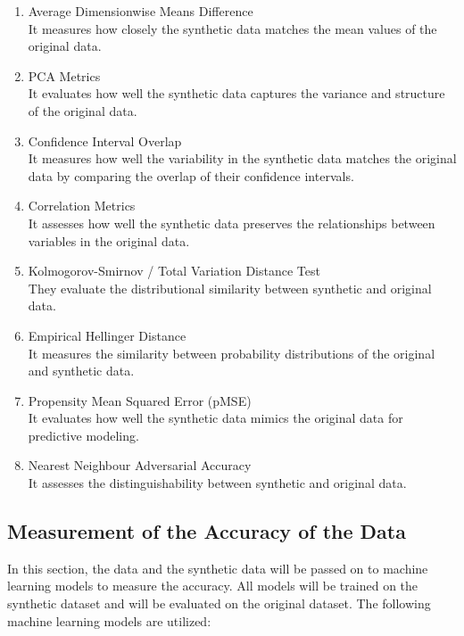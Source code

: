 \begin{enumerate}
    \item Average Dimensionwise Means Difference \\
    It measures how closely the synthetic data matches the mean values of the original data.

    \item PCA Metrics \\
    It evaluates how well the synthetic data captures the variance and structure of the original data.

    \item Confidence Interval Overlap \\
    It measures how well the variability in the synthetic data matches the original data by comparing the overlap of their confidence intervals.

    \item Correlation Metrics \\
    It assesses how well the synthetic data preserves the relationships between variables in the original data.

    \item Kolmogorov-Smirnov / Total Variation Distance Test \\
    They evaluate the distributional similarity between synthetic and original data.

    \item Empirical Hellinger Distance \\
    It measures the similarity between probability distributions of the original and synthetic data.

    \item Propensity Mean Squared Error (pMSE) \\
    It evaluates how well the synthetic data mimics the original data for predictive modeling.

    \item Nearest Neighbour Adversarial Accuracy \\
    It assesses the distinguishability between synthetic and original data.

\end{enumerate}



\subsection{Measurement of the Accuracy of the Data}

In this section, the data and the synthetic data will be passed on to machine learning models to measure the accuracy. All models will be trained on the synthetic dataset and will be evaluated on the original dataset. The following machine learning models are utilized:

